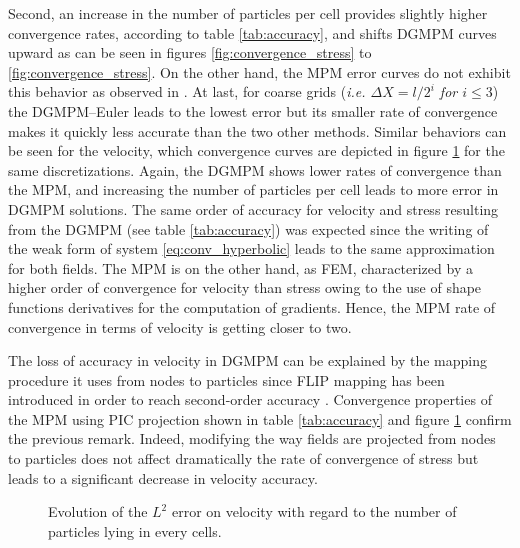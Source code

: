 Second, an increase in the number of particles per cell provides slightly higher convergence rates, according to table \ref{tab:accuracy}, and shifts DGMPM curves upward as can be seen in figures \ref{fig:convergence_stress} to \ref{fig:convergence_stress}. On the other hand, the MPM error curves do not exhibit this behavior as observed in \cite{MPM_BSpline1}. At last, for coarse grids (\textit{i.e. $\Delta X= l/2^i$ for $i \leq 3$}) the DGMPM--Euler leads to the lowest error but its smaller rate of convergence makes it quickly less accurate than the two other methods. Similar behaviors can be seen for the velocity, which convergence curves are depicted in figure \ref{fig:convergence_velocity} for the same discretizations. Again, the DGMPM shows lower rates of convergence than the MPM, and increasing the number of particles per cell leads to more error in DGMPM solutions. The same order of accuracy for velocity and stress resulting from the DGMPM (see table \ref{tab:accuracy}) was expected since the writing of the weak form of system \eqref{eq:conv_hyperbolic} leads to the same approximation for both fields. The MPM is on the other hand, as FEM, characterized by a higher order of convergence for velocity than stress owing to the use of shape functions derivatives for the computation of gradients. Hence, the MPM rate of convergence in terms of velocity is getting closer to two. 

The loss of accuracy in velocity in DGMPM can be explained by the mapping procedure it uses from nodes to particles since FLIP mapping has been introduced in order to reach second-order accuracy \cite{PIC_Nishiguchi}.
Convergence properties of the MPM using PIC projection shown in table \ref{tab:accuracy} and figure \ref{fig:convergence_velocity} confirm the previous remark. Indeed, modifying the way fields are projected from nodes to particles does not affect dramatically the rate of convergence of stress but leads to a significant decrease in velocity accuracy.
\begin{figure}[h!]
  \centering
  {\label{subfig:convV_2ppc}}
  {\label{subfig:convV_6ppc}}
  {\label{subfig:convV_10ppc}}
  {\label{subfig:convV_20ppc}}
  \caption{Evolution of the $L^2$ error on velocity with regard to the number of particles lying in every cells.}
  \label{fig:convergence_velocity}
\end{figure}

